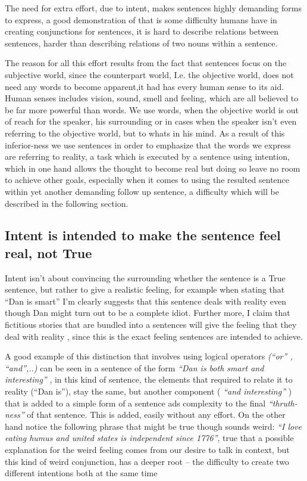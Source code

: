 \documentclass[10pt]{article}
\begin{document}
\par
The need for extra effort, due to intent, makes sentences  highly demanding forms to express, a good demonstration of that is some difficulty humans have in creating conjunctions for sentences, it is hard to describe relations between sentences, harder than describing  relations of two nouns within a sentence.\par

The reason for all this effort results from the fact that sentences focus on the subjective world, since the counterpart world, I.e. the objective world, does not need any words to become apparent,it had has every human sense to its aid. Human senses includes vision, sound, smell and feeling, which are all believed to be far more powerful than words. We use words, when the objective world is out of reach for the speaker, his surrounding or in cases when the speaker isn’t even referring to the objective world, but to whats in his mind. As a result of this inferior-ness we use sentences in order to emphasize that the words we express are referring to reality, a task which is executed by a sentence using intention, which in one hand allows the thought to become real but doing so leave no room to achieve other goals, especially when it comes to using the resulted sentence within yet another demanding follow up sentence, a difficulty which will be described in the following section.\par

\subsection*{Intent is intended to make the sentence feel real, not True}
Intent isn’t about convincing the surrounding whether the sentence is a True sentence, but rather to give a realistic feeling, for example when stating that “Dan is smart” I'm clearly suggests that this sentence deals with reality even though Dan might turn out to be a complete idiot. Further more, I claim that fictitious stories that are bundled into a sentences will give the feeling that they deal with reality , since this is the exact feeling sentences are intended to achieve.\par
A good example of this distinction that involves using logical operators \textit{(“or” , “and”,..)}  can be seen in a sentence of the form \textit{“Dan is both smart and interesting”} , in this kind of sentence,  the elements that required  to relate it to reality  (“Dan is”),  stay the same, but another component ( \textit{“and interesting” }) that is added to a simple form of a sentence ads complexity to the final \textit{“thruth-ness”} of that sentence. This is added, easily without any effort. On the other hand notice the following phrase that might be true though sounds weird: \textit{“I love eating humus and united states is independent since 1776”}, true that a possible explanation for the weird feeling comes from our desire to talk in context, but this kind of weird conjunction, has a deeper root – the difficulty to create two different intentions  both at the same time \par
\end{document}
